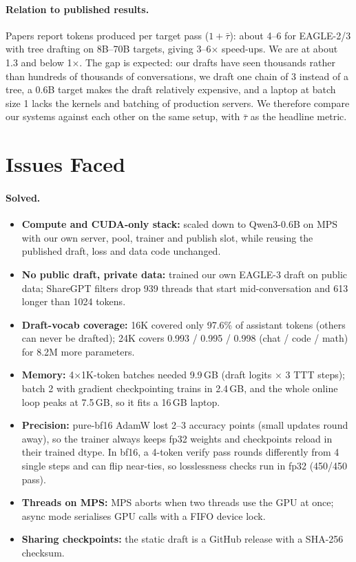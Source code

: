 \documentclass[11pt]{article}
\newcommand{\taubar}{\bar{\tau}}
\begin{document}
\paragraph{Relation to published results.} Papers report tokens produced per target pass ($1+\taubar$): about 4--6
for EAGLE-2/3 with tree drafting on 8B--70B targets, giving 3--6$\times$ speed-ups. We are at about 1.3 and below
1$\times$. The gap is expected: our drafts have seen thousands rather than hundreds of thousands of
conversations, we draft one chain of 3 instead of a tree, a 0.6B target makes the draft relatively expensive,
and a laptop at batch size 1 lacks the kernels and batching of production servers. We therefore compare our
systems against each other on the same setup, with $\taubar$ as the headline metric.

\section{Issues Faced}

\paragraph{Solved.}
\begin{itemize}
  \item \textbf{Compute and CUDA-only stack:} scaled down to Qwen3-0.6B on MPS with our own server, pool,
  trainer and publish slot, while reusing the published draft, loss and data code unchanged.
  \item \textbf{No public draft, private data:} trained our own EAGLE-3 draft on public data; ShareGPT filters
  drop 939 threads that start mid-conversation and 613 longer than 1024 tokens.
  \item \textbf{Draft-vocab coverage:} 16K covered only 97.6\% of assistant tokens (others can never be drafted);
  24K covers 0.993 / 0.995 / 0.998 (chat / code / math) for 8.2M more parameters.
  \item \textbf{Memory:} 4$\times$1K-token batches needed 9.9\,GB (draft logits $\times$ 3 TTT steps); batch 2 with
  gradient checkpointing trains in 2.4\,GB, and the whole online loop peaks at 7.5\,GB, so it fits a 16\,GB laptop.
  \item \textbf{Precision:} pure-bf16 AdamW lost 2--3 accuracy points (small updates round away), so the trainer
  always keeps fp32 weights and checkpoints reload in their trained dtype. In bf16, a 4-token verify pass rounds
  differently from 4 single steps and can flip near-ties, so losslessness checks run in fp32 (450/450 pass).
  \item \textbf{Threads on MPS:} MPS aborts when two threads use the GPU at once; async mode serialises GPU calls
  with a FIFO device lock.
  \item \textbf{Sharing checkpoints:} the static draft is a GitHub release with a SHA-256 checksum.
\end{itemize}
\end{document}
